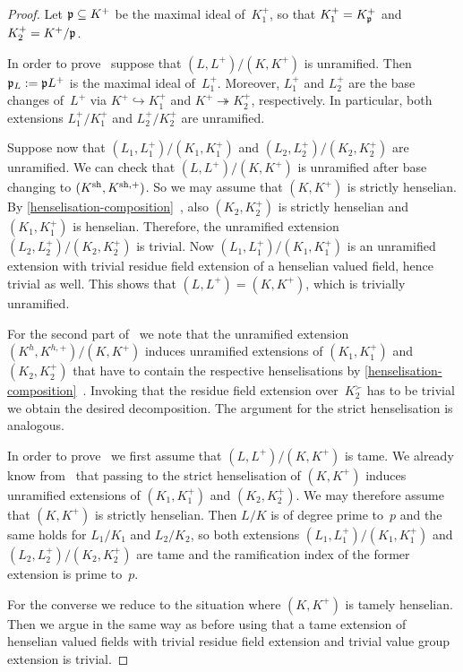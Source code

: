 \begin{proof}
    Let ${\mathfrak p} \subseteq K^+$ be the maximal ideal of~$K_1^+$, so that $K_1^+ = K^+_{\mathfrak p}$ and $K_2^+ = K^+/{\mathfrak p}$.
    
    In order to prove~ suppose that $(L,L^+)/(K,K^+)$ is unramified.
    Then ${\mathfrak p}_L := {\mathfrak p} L^+$ is the maximal ideal of~$L_1^+$.
    Moreover, $L_1^+$ and $L_2^+$ are the base changes of~$L^+$ via $K^+ \hookrightarrow K_1^+$ and $K^+ \twoheadrightarrow K_2^+$, respectively.
    In particular, both extensions $L_1^+/K_1^+$ and $L_2^+/K_2^+$ are unramified.
    
    Suppose now that $(L_1,L_1^+)/(K_1,K_1^+)$ and $(L_2,L_2^+)/(K_2,K_2^+)$ are unramified.
    We can check that $(L,L^+)/(K,K^+)$ is unramified after base changing to $(K^{\rm sh},K^{{\rm sh},+})$.
    So we may assume that $(K,K^+)$ is strictly henselian.
    By \cref{henselisation-composition}~, also $(K_2,K_2^+)$ is strictly henselian and $(K_1,K_1^+)$ is henselian.
    Therefore, the unramified extension $(L_2,L_2^+)/(K_2,K_2^+)$ is trivial.
    Now $(L_1,L_1^+)/(K_1,K_1^+)$ is an unramified extension with trivial residue field extension of a henselian valued field, hence trivial as well.
    This shows that $(L,L^+) = (K,K^+)$, which is trivially unramified.

    For the second part of~ we note that the unramified extension $(K^h,K^{h,+})/(K,K^+)$ induces unramified extensions of $(K_1,K_1^+)$ and $(K_2,K_2^+)$ that have to contain the respective henselisations by \cref{henselisation-composition}~.
    Invoking that the residue field extension over~$K_2^\succ$ has to be trivial we obtain the desired decomposition.
    The argument for the strict henselisation is analogous.

    In order to prove~ we first assume that $(L,L^+)/(K,K^+)$ is tame.
    We already know from~ that passing to the strict henselisation of $(K,K^+)$ induces unramified extensions of $(K_1,K_1^+)$ and $(K_2,K_2^+)$.
    We may therefore assume that $(K,K^+)$ is strictly henselian.
    Then $L/K$ is of degree prime to~$p$ and the same holds for $L_1/K_1$ and $L_2/K_2$, so both extensions $(L_1,L_1^+)/(K_1,K_1^+)$ and $(L_2,L_2^+)/(K_2,K_2^+)$ are tame and the ramification index of the former extension is prime to~$p$.
    
    For the converse we reduce to the situation where $(K,K^+)$ is tamely henselian.
    Then we argue in the same way as before using that a tame extension of henselian valued fields with trivial residue field extension and trivial value group extension is trivial.
\end{proof}


